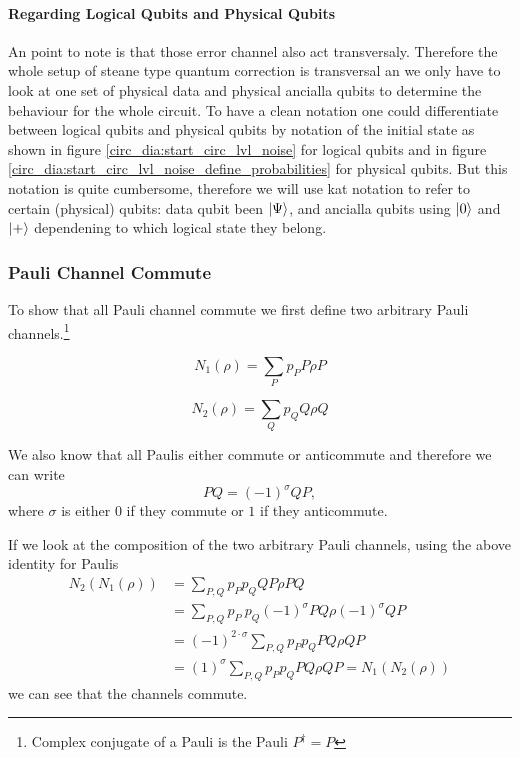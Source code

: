 \paragraph{Regarding Logical Qubits and Physical Qubits}
An point to note is that those error channel also act transversaly. 
Therefore the whole setup of steane type quantum correction is transversal an we only have to look at one set of physical data and physical ancialla qubits to determine the behaviour for the whole circuit.
To have a clean notation one could differentiate between logical qubits and physical qubits by notation of the initial state as shown in figure \ref{circ_dia:start_circ_lvl_noise} for logical qubits and in figure \ref{circ_dia:start_circ_lvl_noise_define_probabilities} for physical qubits.
But this notation is quite cumbersome, therefore we will use kat notation to refer to certain (physical) qubits: data qubit been $\ket{\Psi}$, and ancialla qubits using $\ket{0}$ and $\ket{+}$ dependening to which logical state they belong.


\subsubsection{Pauli Channel Commute}\label{sssec:pauli_channel_commute}

To show that all Pauli channel commute we first define two arbitrary Pauli channels.\footnote{Complex conjugate of a Pauli is the Pauli ${P}^\dag={P}$}

\begin{equation}
    N_1 (\rho) = \sum_P p_P {P} \rho {P}
\end{equation}

\begin{equation}
    N_2 (\rho) = \sum_Q p_Q {Q} \rho {Q}
\end{equation}

We also know that all Paulis either commute or anticommute and therefore we can write
\begin{equation}
    {P}{Q} = (-1)^\sigma {Q} {P},
\end{equation}
where $\sigma$ is either $0$ if they commute or $1$ if they anticommute.

If we look at the composition of the two arbitrary Pauli channels, using the above identity for Paulis
\begin{align*}
    N_2  (N_1 (\rho)) & = \sum_{P,Q} p_P p_Q {Q} {P} \rho {P} {Q} \\
    & = \sum_{P,Q} p_P\  p_Q (-1)^\sigma {P} {Q} \rho (-1)^\sigma {Q} {P} \\
    & = (-1)^{2\cdot\sigma} \sum_{P,Q} p_P p_Q  {P} {Q} \rho  {Q} {P} \\
    & = (1)^\sigma \sum_{P,Q} p_P p_Q  {P} {Q} \rho  {Q} {P}
    = N_1  (N_2 (\rho))
\end{align*}
we can see that the channels commute.

